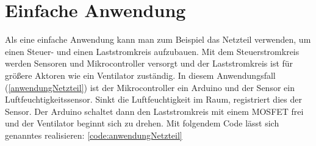 \section{Einfache Anwendung}
Als eine einfache Anwendung kann man zum Beispiel das Netzteil verwenden, um einen Steuer- und einen Laststromkreis aufzubauen. Mit dem Steuerstromkreis werden Sensoren und Mikrocontroller versorgt und der Laststromkreis ist für größere Aktoren wie ein Ventilator zuständig. In diesem Anwendungsfall (\ref{anwendungNetzteil}) ist der Mikrocontroller ein Arduino und der Sensor ein Luftfeuchtigkeitssensor. Sinkt die Luftfeuchtigkeit im Raum, registriert dies der Sensor. Der Arduino schaltet dann den Laststromkreis mit einem MOSFET frei und der Ventilator beginnt sich zu drehen. Mit folgendem Code lässt sich genanntes realisieren: \ref{code:anwendungNetzteil} 

